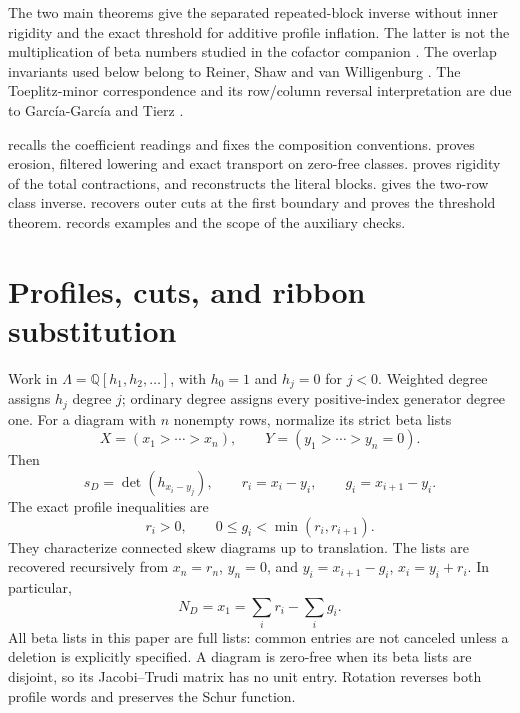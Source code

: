 \documentclass[11pt,a4paper]{amsart}
\numberwithin{equation}{section}
\theoremstyle{plain}
\theoremstyle{definition}
\begin{document}
The two main theorems give the separated repeated-block inverse without
inner rigidity and the exact threshold for additive profile inflation.
The latter is not the multiplication of beta
numbers studied in the cofactor companion \cite{Shields2026Cofactor}.
The overlap invariants used below belong to Reiner, Shaw and van
Willigenburg \cite{Reiner2007Coincidences}.  The Toeplitz-minor
correspondence and its row/column reversal interpretation are due to
Garc\'ia-Garc\'ia and Tierz \cite{GarciaGarcia2020ToeplitzMinors}.

 recalls the coefficient readings and fixes the
composition conventions.   proves erosion,
filtered lowering and exact transport on zero-free classes.
 proves rigidity of the total contractions, and
 reconstructs the literal blocks.
 gives the two-row class inverse.
 recovers outer cuts at the first boundary and
proves the threshold theorem.
 records examples and the scope of the auxiliary checks.

\section{Profiles, cuts, and ribbon substitution}\label{sec:preliminaries}

Work in \(\Lambda=\mathbb Q[h_1,h_2,\ldots]\), with \(h_0=1\)
and \(h_j=0\) for \(j<0\).  Weighted degree assigns \(h_j\) degree
\(j\); ordinary degree assigns every positive-index generator degree one.
For a diagram with \(n\) nonempty rows, normalize its strict beta lists
\[
 X=(x_1>\cdots>x_n),\qquad Y=(y_1>\cdots>y_n=0).
\]
Then
\begin{equation}\label{eq:beta-profile}
 s_D=\det(h_{x_i-y_j}),\qquad
 r_i=x_i-y_i,\qquad g_i=x_{i+1}-y_i.
\end{equation}
The exact profile inequalities are
\begin{equation}\label{eq:profile-validity}
 r_i>0,\qquad 0\le g_i<\min(r_i,r_{i+1}).
\end{equation}
They characterize connected skew diagrams up to translation.  The lists
are recovered recursively from \(x_n=r_n\), \(y_n=0\), and
\(y_i=x_{i+1}-g_i\), \(x_i=y_i+r_i\).  In particular,
\begin{equation}\label{eq:content-span}
 N_D=x_1=\sum_i r_i-\sum_i g_i.
\end{equation}
All beta lists in this paper are full lists: common entries are not
canceled unless a deletion is explicitly specified.  A diagram is
zero-free when its beta lists are disjoint, so its Jacobi--Trudi matrix
has no unit entry.  Rotation reverses both profile words and preserves
the Schur function.
\end{document}

